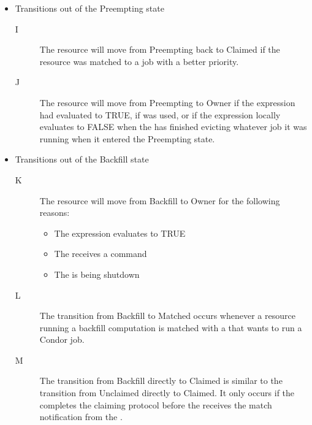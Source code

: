 \begin{itemize}
\begin{description}
\end{description}


\item Transitions out of the Preempting state

\begin{description}

\item[I] The resource will move from Preempting back to Claimed if the
  resource was matched to a job with a better priority.

\item[J] The resource will move from Preempting to Owner if the
   expression had evaluated to TRUE, if 
  was used, or if the  expression locally evaluates to
  FALSE when the  has finished evicting whatever job it
  was running when it entered the Preempting state.

\end{description}


\item Transitions out of the Backfill state

\begin{description}

\item[K] The resource will move from Backfill to Owner for the
  following reasons:
  \begin{itemize}
  \item The  expression evaluates to TRUE
  \item The  receives a  command
  \item The  is being shutdown
  \end{itemize}
 
\item[L] The transition from Backfill to Matched occurs whenever a
  resource running a backfill computation is matched with a
   that wants to run a Condor job.

\item[M] The transition from Backfill directly to Claimed is similar
  to the transition from Unclaimed directly to Claimed.
  It only occurs if the  completes the claiming
  protocol before the  receives the match notification
  from the .

\end{description}


\end{itemize}

